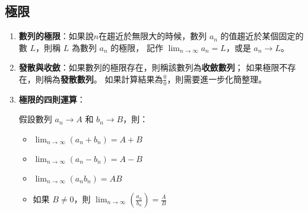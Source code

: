 \documentclass[12pt]{article}
\begin{document}
\begin{tcolorbox}[colframe=black!60!blue, colback=blue!5!white, arc=4pt, boxrule=1pt]
\section{極限}
\begin{enumerate}
    \item \textbf{數列的極限}：如果說$n$在趨近於無限大的時候，數列 $a_n$ 
    的值趨近於某個固定的數 $L$，則稱 $L$ 為數列 $a_n$ 的極限，
    記作 $\displaystyle\lim_{n \to \infty} a_n = L$，或是 $a_n \to L$。
    \item \textbf{發散與收斂}：如果數列的極限存在，則稱該數列為\textbf{收斂數列}；
    如果極限不存在，則稱為\textbf{發散數列}。
    如果計算結果為$\frac{0}{0}$，則需要進一步化簡整理。
    \item \textbf{極限的四則運算}：
    
    假設數列 $a_n \to A$ 和 $b_n \to B$，則：
    \begin{itemize}
        \item $\lim_{n \to \infty} (a_n + b_n) = A + B$
        \item $\lim_{n \to \infty} (a_n - b_n) = A - B$
        \item $\lim_{n \to \infty} (a_n b_n) = AB$
        \item 如果 $B \neq 0$，則 $\lim_{n \to \infty} \left(\frac{a_n}{b_n}\right) = \frac{A}{B}$
    \end{itemize}

\end{enumerate}

\end{tcolorbox}
\end{document}
